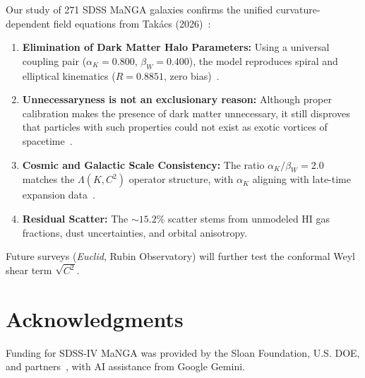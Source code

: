 \documentclass[11pt,a4paper]{article}
\begin{document}
Our study of 271 SDSS MaNGA galaxies confirms the unified curvature-dependent field equations from Tak\'acs (2026)~\cite{Takacs2026}:
\begin{enumerate}
	\item \textbf{Elimination of Dark Matter Halo Parameters:} Using a universal coupling pair ($\alpha_K = 0.800$, $\beta_W = 0.400$), the model reproduces spiral and elliptical kinematics ($R = 0.8851$, zero bias)~\cite{Takacs2026}.
	\item \textbf{Unnecessaryness is not an exclusionary reason:} Although proper calibration makes the presence of dark matter unnecessary, it still disproves that particles with such properties could not exist as exotic vortices of spacetime~\cite{Takacs2026b}.
	\item \textbf{Cosmic and Galactic Scale Consistency:} The ratio $\alpha_K / \beta_W = 2.0$ matches the $\Lambda(K, C^2)$ operator structure, with $\alpha_K$ aligning with late-time expansion data~\cite{Takacs2026,DESI2024}.
	\item \textbf{Residual Scatter:} The $\sim 15.2\%$ scatter stems from unmodeled HI gas fractions, dust uncertainties, and orbital anisotropy.
\end{enumerate}

Future surveys (\textit{Euclid}, Rubin Observatory) will further test the conformal Weyl shear term $\sqrt{C^2}$.

\section*{Acknowledgments}

Funding for SDSS-IV MaNGA was provided by the Sloan Foundation, U.S. DOE, and partners~\cite{Bundy2015}, with AI assistance from Google Gemini.
\end{document}
